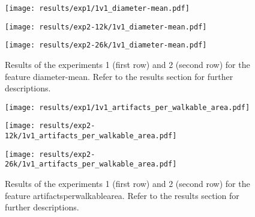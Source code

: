 \begin{figure}[h!]
    \centering
	\begin{minipage}{0.3\linewidth}
		\texttt{[image: results/exp1/1v1\_diameter-mean.pdf]}
	\end{minipage}

	\begin{minipage}{0.3\linewidth}
		\texttt{[image: results/exp2-12k/1v1\_diameter-mean.pdf]}
	\end{minipage}
	\begin{minipage}{0.3\linewidth}
		\texttt{[image: results/exp2-26k/1v1\_diameter-mean.pdf]}
	\end{minipage}

	\caption[ Results: Feature diameter-mean]{ Results of the experiments 1 (first row) and 2 (second row) for the feature diameter-mean. Refer to the results section for further descriptions. }
	\label{fig:appendix_diameter-mean}
\end{figure}
 \newpage 

 
\begin{figure}[h!]
    \centering
	\begin{minipage}{0.3\linewidth}
		\texttt{[image: results/exp1/1v1\_artifacts\_per\_walkable\_area.pdf]}
	\end{minipage}

	\begin{minipage}{0.3\linewidth}
		\texttt{[image: results/exp2-12k/1v1\_artifacts\_per\_walkable\_area.pdf]}
	\end{minipage}
	\begin{minipage}{0.3\linewidth}
		\texttt{[image: results/exp2-26k/1v1\_artifacts\_per\_walkable\_area.pdf]}
	\end{minipage}

	\caption[ Results: Feature artifacts\textunderscore per\textunderscore walkable\textunderscore area]{ Results of the experiments 1 (first row) and 2 (second row) for the feature artifacts\textunderscore per\textunderscore walkable\textunderscore area. Refer to the results section for further descriptions. }
	\label{fig:appendix_artifacts_per_walkable_area}
\end{figure}
 
